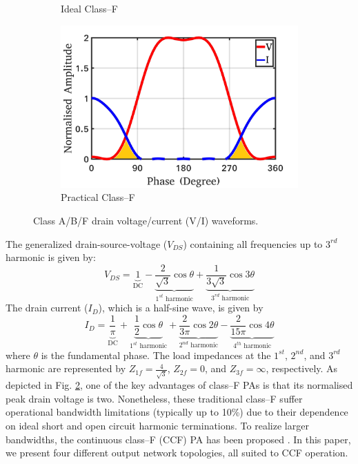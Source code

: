 \documentclass[conference]{IEEEtran}
\begin{document}
\begin{figure}[!t]
\begin{subfigure}{0.24\textwidth}
\caption{Ideal Class--F}
\label{fig:ICF_wave_VI}
\end{subfigure}
\begin{subfigure}{0.24\textwidth}
\includegraphics[width=1\textwidth]{Images/Intro/CF_wave_VI_shaded.pdf}
\caption{Practical Class--F}
\label{fig:CF_wave_VI}
\end{subfigure}
\caption{Class A/B/F drain  voltage/current (V/I) waveforms.}
\label{fig:wave_VI}
\vspace{-0.25in}
\end{figure}
The generalized drain-source-voltage ($V_{DS}$) containing all frequencies up to $3^{rd}$ harmonic \cite{Gen_Vds_eqn} is given by:
\begin{equation}
V_{DS}=\underbrace{1}_{\text{DC}}-\underbrace{\frac{2}{\sqrt{3}} \cos \theta}_{\text{$1^{st}$ harmonic}}+\underbrace{\frac{1}{3 \sqrt{3}} \cos 3 \theta}_{\text{$3^{rd}$ harmonic}}
\label{eqn_CF_V}
\end{equation}
The drain current ($I_{D}$), which is a half-sine wave, is given by
\begin{equation}
I_{D}=\underbrace{\frac{1}{\pi}}_{\text{DC}}+\underbrace{\frac{1}{2} \cos \theta}_{\text{$1^{st}$ harmonic}}+\underbrace{\frac{2}{3 \pi} \cos 2 \theta}_{\text{$2^{nd}$ harmonic}}-\underbrace{\frac{2}{15 \pi} \cos 4 \theta}_{\text{$4^{th}$ harmonic}}
\label{eqn_CCF_I}
\end{equation}
where $\theta$ is the fundamental phase. The load impedances at the  $1^{st}$, $2^{nd}$, and $3^{rd}$ harmonic are represented by $Z_{1f}=\frac{4}{\sqrt{3}}$, $Z_{2f}=0$, and $Z_{3f}=\infty$, respectively. As depicted in Fig. \ref{fig:CF_wave_VI},  one of the key advantages of class--F PAs is that its normalised peak drain voltage is two. Nonetheless, these traditional class--F suffer operational bandwidth limitations (typically up to 10\%) due to their dependence on ideal short and open circuit harmonic terminations. To realize larger bandwidths, the continuous class--F (CCF) PA has been proposed \cite{CCF_reason}. In this paper, we present four different output network topologies, all suited to CCF operation. 
\end{document}
